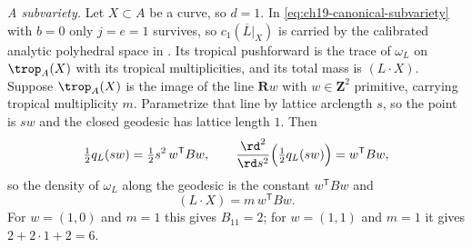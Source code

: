 \begin{example}
\emph{A subvariety.}  Let $X\subset A$ be a curve, so $d=1$.  In
\eqref{eq:ch19-canonical-subvariety} with $b=0$ only $j=e=1$ survives,
so $c_1(\overline L|_X)$ is carried by the calibrated analytic polyhedral
space in .  Its tropical pushforward
is the trace of $\omega_L$ on $\trop_A(X)$ with its tropical
multiplicities, and its total mass is $(L\cdot X)$.  Suppose
$\trop_A(X)$ is the image of the line $\mathbf Rw$ with
$w\in\mathbf Z^2$ primitive, carrying tropical multiplicity $m$.
Parametrize that line by lattice arclength $s$, so the point is $sw$ and
the closed geodesic has lattice length $1$.  Then
\[
 \tfrac12q_L(sw)=\tfrac12s^2\,w^{\mathsf T}Bw,
 \qquad
 \frac{\rd^2}{\rd s^2}\Bigl(\tfrac12q_L(sw)\Bigr)=w^{\mathsf T}Bw,
\]
so the density of $\omega_L$ along the geodesic is the constant
$w^{\mathsf T}Bw$ and
\[
 (L\cdot X)=m\,w^{\mathsf T}Bw .
\]
For $w=(1,0)$ and $m=1$ this gives $B_{11}=2$; for $w=(1,1)$ and
$m=1$ it gives $2+2\cdot1+2=6$.
\end{example}

